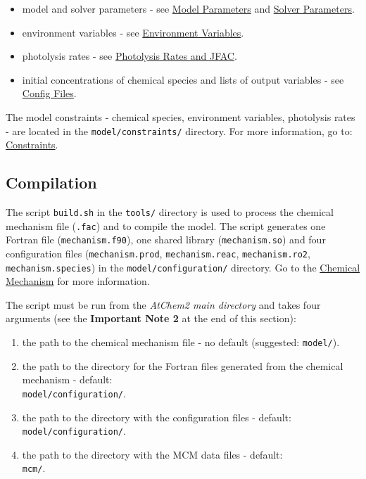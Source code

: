 \begin{itemize}
\item model and solver parameters - see
  \hyperref[sec:parameters]{Model Parameters} and
  \hyperref[sec:solver]{Solver Parameters}.
\item environment variables - see \hyperref[sec:envvar]{Environment
    Variables}.
\item photolysis rates - see \hyperref[sec:photolysis]{Photolysis
    Rates and JFAC}.
\item initial concentrations of chemical species and lists of output
  variables - see \hyperref[sec:config]{Config Files}.
\end{itemize}

The model constraints - chemical species, environment variables,
photolysis rates - are located in the \texttt{model/constraints/}
directory. For more information, go to:
\hyperref[sec:constraints]{Constraints}.

\subsection{Compilation} \label{subsec:compilation}

The script \texttt{build.sh} in the \texttt{tools/} directory is used
to process the chemical mechanism file (\texttt{.fac}) and to compile
the model. The script generates one Fortran file
(\texttt{mechanism.f90}), one shared library (\texttt{mechanism.so})
and four configuration files (\texttt{mechanism.prod},
\texttt{mechanism.reac}, \texttt{mechanism.ro2},
\texttt{mechanism.species}) in the \texttt{model/configuration/}
directory. Go to the \hyperref[sec:mechanism]{Chemical Mechanism} for
more information.

The script must be run from the \emph{AtChem2 main directory} and
takes four arguments (see the \textbf{Important Note 2} at the end of
this section):

\begin{enumerate}
\item the path to the chemical mechanism file - no default (suggested:
  \texttt{model/}).
\item the path to the directory for the Fortran files generated from
  the chemical mechanism - default:\\ \texttt{model/configuration/}.
\item the path to the directory with the configuration files -
  default:\\ \texttt{model/configuration/}.
\item the path to the directory with the MCM data files - default:\\
  \texttt{mcm/}.
\end{enumerate}

